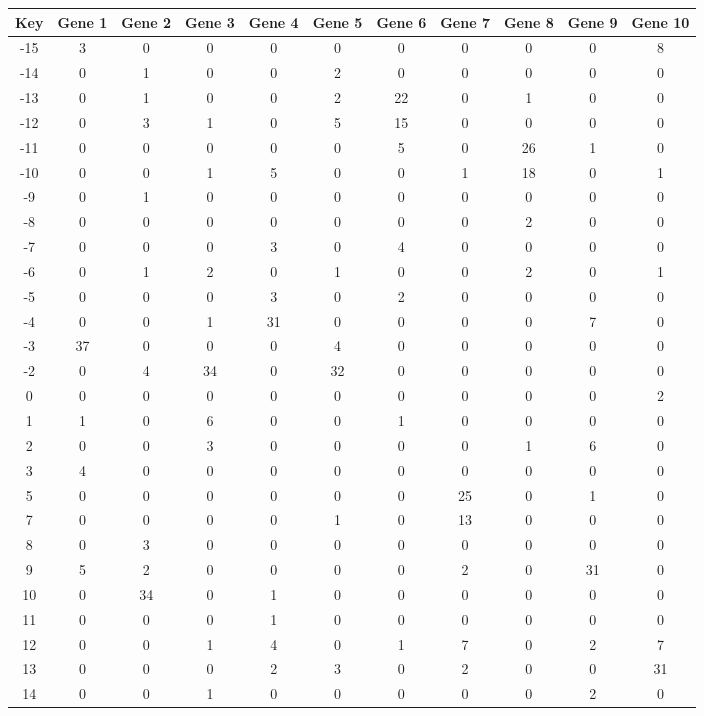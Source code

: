 \begin{tabular}{|c|c|c|c|c|c|c|c|c|c|c|}
\hline
Key & Gene 1 & Gene 2 & Gene 3 & Gene 4 & Gene 5 & Gene 6 & Gene 7 & Gene 8 & Gene 9 & Gene 10 \\
\hline
-15 & 3 & 0 & 0 & 0 & 0 & 0 & 0 & 0 & 0 & 8 \\
-14 & 0 & 1 & 0 & 0 & 2 & 0 & 0 & 0 & 0 & 0 \\
-13 & 0 & 1 & 0 & 0 & 2 & 22 & 0 & 1 & 0 & 0 \\
-12 & 0 & 3 & 1 & 0 & 5 & 15 & 0 & 0 & 0 & 0 \\
-11 & 0 & 0 & 0 & 0 & 0 & 5 & 0 & 26 & 1 & 0 \\
-10 & 0 & 0 & 1 & 5 & 0 & 0 & 1 & 18 & 0 & 1 \\
-9 & 0 & 1 & 0 & 0 & 0 & 0 & 0 & 0 & 0 & 0 \\
-8 & 0 & 0 & 0 & 0 & 0 & 0 & 0 & 2 & 0 & 0 \\
-7 & 0 & 0 & 0 & 3 & 0 & 4 & 0 & 0 & 0 & 0 \\
-6 & 0 & 1 & 2 & 0 & 1 & 0 & 0 & 2 & 0 & 1 \\
-5 & 0 & 0 & 0 & 3 & 0 & 2 & 0 & 0 & 0 & 0 \\
-4 & 0 & 0 & 1 & 31 & 0 & 0 & 0 & 0 & 7 & 0 \\
-3 & 37 & 0 & 0 & 0 & 4 & 0 & 0 & 0 & 0 & 0 \\
-2 & 0 & 4 & 34 & 0 & 32 & 0 & 0 & 0 & 0 & 0 \\
0 & 0 & 0 & 0 & 0 & 0 & 0 & 0 & 0 & 0 & 2 \\
1 & 1 & 0 & 6 & 0 & 0 & 1 & 0 & 0 & 0 & 0 \\
2 & 0 & 0 & 3 & 0 & 0 & 0 & 0 & 1 & 6 & 0 \\
3 & 4 & 0 & 0 & 0 & 0 & 0 & 0 & 0 & 0 & 0 \\
5 & 0 & 0 & 0 & 0 & 0 & 0 & 25 & 0 & 1 & 0 \\
7 & 0 & 0 & 0 & 0 & 1 & 0 & 13 & 0 & 0 & 0 \\
8 & 0 & 3 & 0 & 0 & 0 & 0 & 0 & 0 & 0 & 0 \\
9 & 5 & 2 & 0 & 0 & 0 & 0 & 2 & 0 & 31 & 0 \\
10 & 0 & 34 & 0 & 1 & 0 & 0 & 0 & 0 & 0 & 0 \\
11 & 0 & 0 & 0 & 1 & 0 & 0 & 0 & 0 & 0 & 0 \\
12 & 0 & 0 & 1 & 4 & 0 & 1 & 7 & 0 & 2 & 7 \\
13 & 0 & 0 & 0 & 2 & 3 & 0 & 2 & 0 & 0 & 31 \\
14 & 0 & 0 & 1 & 0 & 0 & 0 & 0 & 0 & 2 & 0 \\
\hline
\end{tabular}